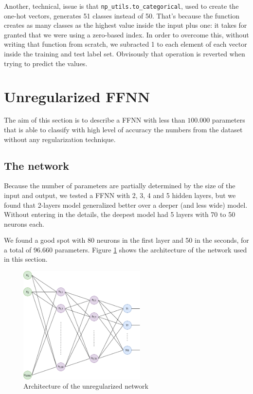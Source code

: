 \documentclass[compsoc]{IEEEtran}
\begin{document}
Another, technical, issue is that \texttt{np\_utils.to\_categorical}, used to create the one-hot vectors, generates 51 classes instead of 50. That's because the function creates as many classes as the highest value inside the input plus one: it takes for granted that we were using a zero-based index. In order
to overcome this, without writing that function from scratch, we subracted 1 to each element of each vector inside the training and test label set.
Obvisously that operation is reverted when trying to predict the values.


\section{Unregularized FFNN}

The aim of this section is to describe a FFNN with less than $100.000$ parameters that is able to classify
with high level of accuracy the numbers from the dataset without any regularization technique. 

\subsection{The network}
Because the number of parameters
are partially determined by the size of the input and output, we tested a FFNN with 2, 3, 4 and 5 hidden layers, but we found that 2-layers model
generalized better over a deeper (and less wide) model. Without entering in the details, the deepest model had 5 layers with 70 to 50 neurons each.\par 


We found a good spot with 80 neurons in the first layer and 50 in the seconds, for a total of 96.660 parameters. 
Figure \ref{fig:noregffnn} shows the architecture of the network used in this section.






\begin{figure}[ht!]
\centering                                                                        
\includegraphics[width=2.5in]{noregffnn.png}
\captionsetup{justification=centering}                                                                                       
\caption{Architecture of the unregularized network}
\label{fig:noregffnn}
\end{figure}
\end{document}
